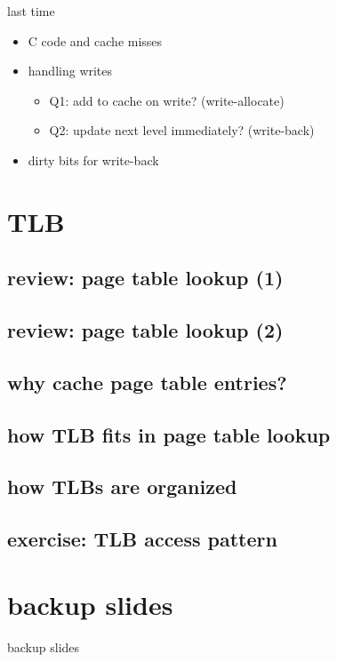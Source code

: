 \date{}
\title{}
\date{}

\begin{frame}
    \titlepage
\end{frame}


\usetikzlibrary{calc}

\begin{frame}{last time}
    \begin{itemize}
    \item C code and cache misses
    \item handling writes
        \begin{itemize}
        \item Q1: add to cache on write? (write-allocate)
        \item Q2: update next level immediately? (write-back)
        \end{itemize}
    \item dirty bits for write-back
    \end{itemize}
\end{frame}

\section{TLB}

\subsection{review: page table lookup (1)}


\subsection{review: page table lookup (2)}

\subsection{why cache page table entries?}


\subsection{how TLB fits in page table lookup}


\subsection{how TLBs are organized}

\subsection{exercise: TLB access pattern}







\section{backup slides}
\begin{frame}{backup slides}
\end{frame}


